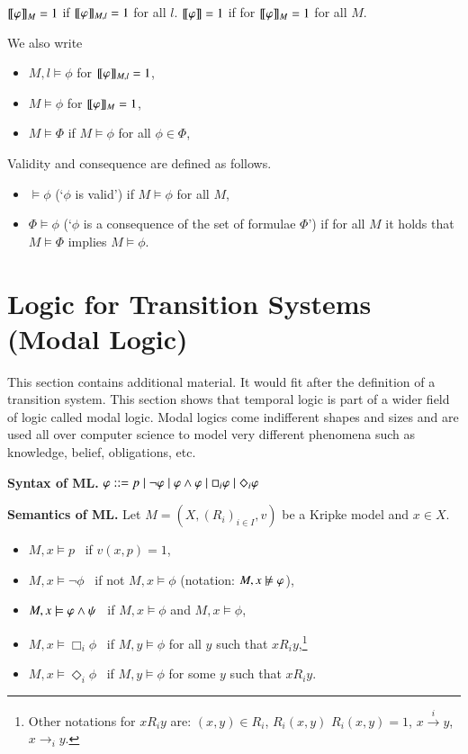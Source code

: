 \medskip\noindent
$[\![\varphi]\!]_{M}=1$ if $[\![\varphi]\!]_{M,l}=1$ for all $l$.
$[\![\varphi]\!]=1$ if for $[\![\varphi]\!]_{M}=1$ for all $M$.

\medskip\noindent
We also write 
%
\begin{itemize}
\item $M,l\models\phi$ for $[\![\varphi]\!]_{M,l}=1$,
\item $M\models\phi$ for $[\![\varphi]\!]_{M}=1$,
\item $M\models\Phi$ if $M\models\phi$ for all $\phi\in\Phi$,
\end{itemize}

Validity and consequence are defined as follows.
\begin{itemize}
\item $\models\phi$ (`$\phi$ is valid') if $M\models\phi$ for all $M$,
\item $\Phi\models\phi$ (`$\phi$ is a consequence of the set of
  formulae $\Phi$') if for all $M$ it holds that $M\models\Phi$
  implies $M\models\phi$.
\end{itemize}



%
\section{Logic for Transition Systems (Modal Logic)}\label{sec:ml}

This section contains additional material. It would fit after the
definition of a transition system. This section shows that temporal
logic is part of a wider field of logic called modal logic. Modal
logics come indifferent shapes and sizes and are used all over
computer science to model very different phenomena such as knowledge,
belief, obligations, etc. 

\medskip\noindent \textbf{Syntax of ML.} $\varphi::=p \mid \neg\varphi \mid
\varphi\wedge\varphi \mid \Box_i\varphi \mid \Diamond_i\varphi$

\bigskip\noindent\textbf{Semantics of ML. } Let $M=(X,(R_i)_{i\in
  I},v)$ be a Kripke model and $x\in X$.
\begin{itemize}
\item $M,x\models p$ \ if $v(x,p)=1$,
\item $M,x\models \neg\phi$ \ if not $M,x\models \phi$ (notation:
  $M,x\notmodels \phi$),
\item $M,x\models \varphi\wedge\psi$ \ if $M,x\models \phi$ and $M,x\models \phi$,
\item $M,x\models \Box_i\phi$ \ if $M,y\models\phi$ for all $y$ such
  that $x R_i y$,\footnote{Other notations for $x R_i y$ are:
    $(x,y)\in R_i$, $R_i(x,y)$ $R_i(x,y)=1$,
    $x\stackrel{i}{\longrightarrow}y$, $x\longrightarrow_i y$.}
\item $M,x\models \Diamond_i\phi$ \ if $M,y\models\phi$ for some $y$ such
  that $x R_i y$.
\end{itemize}

